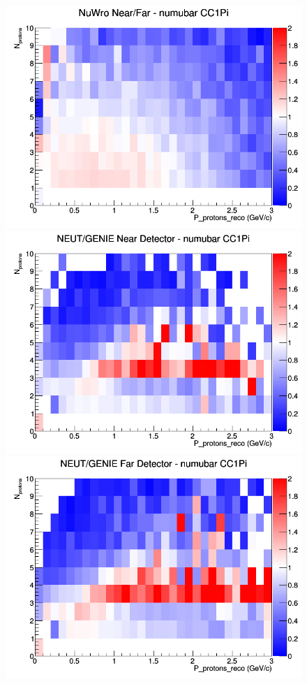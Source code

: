 \begin{figure}[h]
\endminipage
{}
\includegraphics[width=\linewidth]{eff_N_P/LAr/protons/ratios/CC1Pi_NuWro_numubar_NF_N_P.png}
\endminipage
\newline
{}
\includegraphics[width=\linewidth]{eff_N_P/LAr/protons/ratios/CC1Pi_NEUT_GENIE_numubar_near_N_P.png}
\endminipage
{}
\includegraphics[width=\linewidth]{eff_N_P/LAr/protons/ratios/CC1Pi_NEUT_GENIE_numubar_far_N_P.png}

\end{figure}
